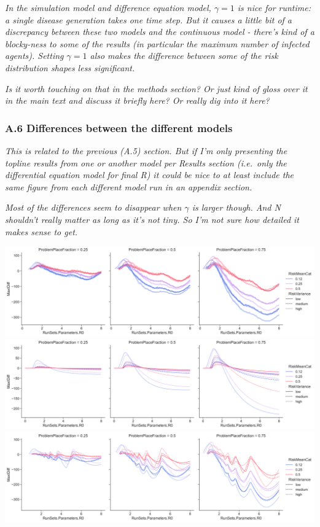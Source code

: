 \emph{In the simulation model and difference equation model,
\(\gamma = 1\) is nice for runtime: a single disease generation takes
one time step. But it causes a little bit of a discrepancy between these
two models and the continuous model - there's kind of a blocky-ness to
some of the results (in particular the maximum number of infected
agents). Setting \(\gamma = 1\) also makes the difference between some
of the risk distribution shapes less significant.}

\emph{Is it worth touching on that in the methods section? Or just kind
of gloss over it in the main text and discuss it briefly here? Or really
dig into it here?}

\subsubsection{A.6 Differences between the different
models}\label{a.6-differences-between-the-different-models}

\emph{This is related to the previous (A.5) section. But if I'm only
presenting the topline results from one or another model per Results
section (i.e.~only the differential equation model for final R) it could
be nice to at least include the same figure from each different model
run in an appendix section.}

\emph{Most of the differences seem to disappear when \(\gamma\) is
larger though. And N shouldn't really matter as long as it's not tiny.
So I'm not sure how detailed it makes sense to get.}

\includegraphics{images/MaxISim.png} \includegraphics{images/MaxI.png}
\includegraphics{images/MaxIDifference.png}

